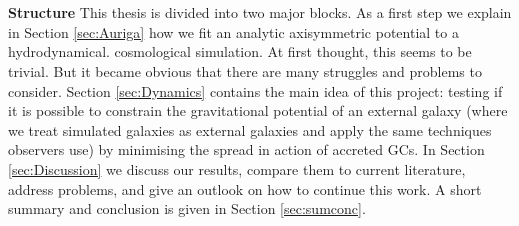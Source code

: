 \\\\
\textbf{Structure}
This thesis is divided into two major blocks. As a first step we explain in Section \ref{sec:Auriga} how we fit an analytic axisymmetric potential to a hydrodynamical. cosmological simulation. At first thought, this seems to be trivial. But it became obvious that there are many struggles and problems to consider. Section \ref{sec:Dynamics} contains the main idea of this project: testing if it is possible to constrain the gravitational potential of an external galaxy (where we treat simulated galaxies as external galaxies and apply the same techniques observers use) by minimising the spread in action of accreted \acp{GC}. In Section \ref{sec:Discussion} we discuss our results, compare them to current literature, address problems, and give an outlook on how to continue this work. A short summary and conclusion is given in Section \ref{sec:sumconc}.
